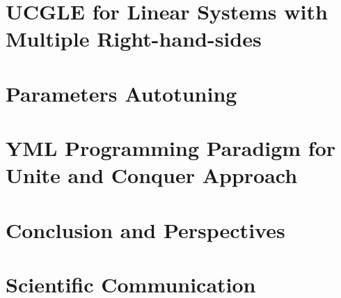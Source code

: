 \documentclass{xinzhewu}
\begin{document}


\chapter{UCGLE for Linear Systems with Multiple Right-hand-sides} \label{UCGLE for Linear Systems with Multiple Right-hand-sides}



\chapter{Parameters Autotuning}  \label{Parameters Autotuning}



\chapter{YML Programming Paradigm for Unite and Conquer Approach} \label{YML and XMP Multi-level Parallelism Programming Paradigm}



\chapter{Conclusion and Perspectives} \label{Conclusion and Pespectives}



\clearemptydoublepage


\clearemptydoublepage

\appendix
\chapter{Scientific Communication}



\clearemptydoublepage
\end{document}

